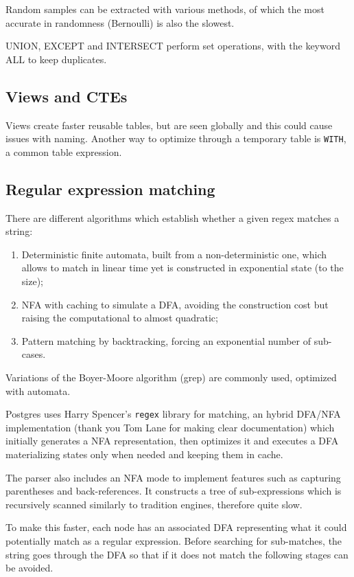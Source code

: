 Random samples can be extracted with various methods, of which the most accurate in randomness (Bernoulli) is also the slowest.

UNION, EXCEPT and INTERSECT perform set operations, with the keyword ALL to keep duplicates.

\subsection{Views and CTEs}
Views create faster reusable tables, but are seen globally and this could cause issues with naming. Another way to optimize through a temporary table is \texttt{WITH}, a common table expression.


\subsection{Regular expression matching}
There are different algorithms which establish whether a given regex matches a string:
\begin{enumerate}
	\item Deterministic finite automata, built from a non-deterministic one, which allows to match in linear time yet is constructed in exponential state (to the size);
	\item NFA with caching to simulate a DFA, avoiding the construction cost but raising the computational to almost quadratic;
	\item Pattern matching by backtracking, forcing an exponential number of sub-cases.
\end{enumerate}
Variations of the Boyer-Moore algorithm (grep) are commonly used, optimized with automata. 

Postgres uses Harry Spencer's \texttt{regex} library for matching, an hybrid DFA/NFA implementation (thank you Tom Lane for making clear documentation) which initially generates a NFA representation, then optimizes it and executes a DFA materializing states only when needed and keeping them in cache. 

The parser also includes an NFA mode to implement features such as capturing parentheses and back-references. It constructs a tree of sub-expressions which is recursively scanned similarly to tradition engines, therefore quite slow. 

To make this faster, each node has an associated DFA representing what it could potentially match as a regular expression. Before searching for sub-matches, the string goes through the DFA so that if it does not match the following stages can be avoided.

